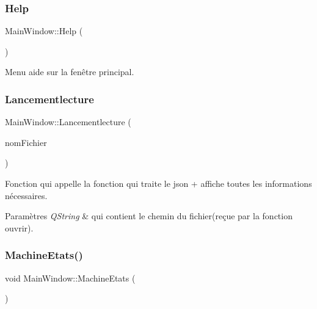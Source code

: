 \subsubsection{\texorpdfstring{Help}{Help}}
{\footnotesize\ttfamily Main\+Window\+::\+Help (\begin{DoxyParamCaption}{ }\end{DoxyParamCaption})\hspace{0.3cm}{\ttfamily [slot]}}



Menu aide sur la fenêtre principal. 

\mbox{\label{class_main_window_ac368dfd7e2609f0cb72fc1428771aa97}} 
\subsubsection{\texorpdfstring{Lancementlecture}{Lancementlecture}}
{\footnotesize\ttfamily Main\+Window\+::\+Lancementlecture (\begin{DoxyParamCaption}\item[{Q\+String}]{nom\+Fichier }\end{DoxyParamCaption})\hspace{0.3cm}{\ttfamily [slot]}}



Fonction qui appelle la fonction qui traite le json + affiche toutes les informations nécessaires. 


\begin{DoxyParams}{Paramètres}
{\em Q\+String} & qui contient le chemin du fichier(reçue par la fonction ouvrir). \\
\hline
\end{DoxyParams}
\mbox{\label{class_main_window_a59cd9a83e43405ae1ad5c18e79b04db5}} 
\subsubsection{\texorpdfstring{Machine\+Etats()}{MachineEtats()}}
{\footnotesize\ttfamily void Main\+Window\+::\+Machine\+Etats (\begin{DoxyParamCaption}{ }\end{DoxyParamCaption})}

